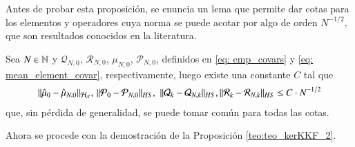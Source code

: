 Antes de probar esta proposición, se enuncia un lema que permite dar cotas para los elementos y operadores cuya norma se puede acotar por algo de orden $N^{-1/2}$, que son resultados conocidos en la literatura.
\begin{lema} Sea $N \in \mathbb{N}$ y $\mathcal{Q}_{N,0}$, $\mathcal{R}_{N,0}$, $\mu_{N,0}$, $\mathcal{P}_{N,0}$, definidos en \ref{eq: emp_covars} y \ref{eq: mean_element_covar}, respectivamente, luego existe una constante $C$ tal que
	\begin{equation*}
		\| \hat{\mu}_0 - \hat{\mu}_{N,0} \|_{\mathcal{H}_{\mathcal{X}}}, \, \|  \mathcal{P}_{0} -  \mathcal{P}_{N,0}\|_{HS}, \, \, \| \mathcal{Q}_{k} - \mathcal{Q}_{N, k} \|_{HS}, \| \mathcal{R}_{k} - \mathcal{R}_{N, k} \|_{HS} \leq C\cdot N^{-1/2}
	\end{equation*}
	que, sin pérdida de generalidad, se puede tomar común para todas las cotas.
	\label{lema:oper_sqrt_N}
\end{lema}
Ahora se procede con la demostración de la Proposición \ref{teo:teo_kerKKF_2}.
